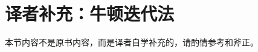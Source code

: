 \section{译者补充：牛顿迭代法}\label{sec:译者补充：牛顿迭代法}
\begin{remark}
    本节内容不是原书内容，而是译者自学补充的，请酌情参考和斧正。
\end{remark}

